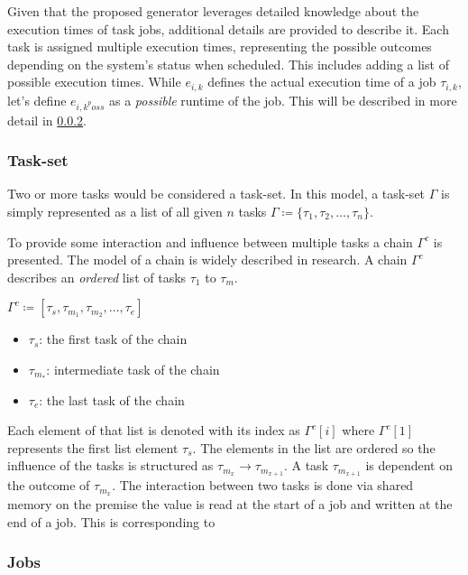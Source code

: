 Given that the proposed generator leverages detailed knowledge about the execution times of task jobs, additional details are provided to describe it. 
Each task is assigned multiple execution times, representing the possible outcomes depending on the system's status when scheduled. This includes adding a list of possible execution times.
While $e_{i,k}$ defines the actual execution time of a job $\tau_{i,k}$\cite{buttazzoHardRealTimeComputing2024}, let's define $e_{{i,k}^poss}$ as a \textit{possible} runtime of the job.
This will be described in more detail in \cref{sec:job}.

\subsubsection{Task-set}\label{sec:taskset}
Two or more tasks would be considered a task-set.
In this model, a task-set $\Gamma$ is simply represented as a list of all given $n$ tasks $\Gamma \coloneqq \{\tau_1, \tau_2, \ldots, \tau_n\}$.

To provide some interaction and influence between multiple tasks a chain $\Gamma^c$ is presented.
The model of a chain is widely described in research\cite{
beckerSynthesizingJoblevelDependencies2016,abdullahWorstcaseCauseeffectReaction2019,choiChainBasedFixedPriorityScheduling2020}.
A chain $\Gamma^c$ describes an \textit{ordered} list of tasks $\tau_1$ to $\tau_m$.
\begin{center}
	$\Gamma^c \coloneqq [\tau_s,\tau_{m_1},\tau_{m_2}, \ldots, \tau_e]$
\end{center}
\begin{itemize}
	\item $\tau_s$: the first task of the chain
	\item $\tau_{m_*}$: intermediate task of the chain
	\item $\tau_e$: the last task of the chain
\end{itemize}
Each element of that list is denoted with its index as $\Gamma^c[i]$ where $\Gamma^c[1]$ represents the first list element $\tau_s$\cite{choiChainBasedFixedPriorityScheduling2020}.
The elements in the list are ordered so the influence of the tasks is structured as $\tau_{m_x} \rightarrow \tau_{m_{x+1}}$.
A task $\tau_{m_{x+1}}$ is dependent on the outcome of $ \tau_{m_{x}}$.
The interaction between two tasks is done via shared memory on the premise the value is read at the start of a job and written at the end of a job.
This is corresponding to 


\subsubsection{Jobs}\label{sec:job}

